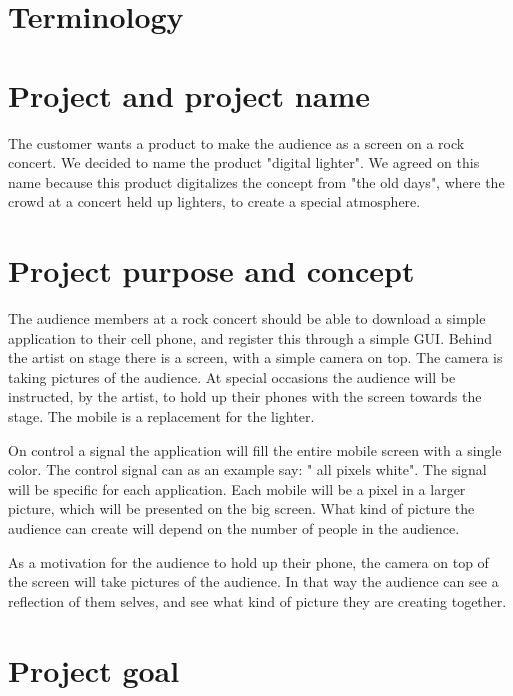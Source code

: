 \section {Terminology}
\section{Project and project name}

The customer wants a product to make the audience as a screen on a rock concert. We decided to name the product "digital lighter". We agreed on this name because this product digitalizes the concept from "the old days", where the crowd at a concert held up lighters, to create a special atmosphere. 

\section{Project purpose and concept}

The audience members at a rock concert should be able to download a simple application to their cell phone, and register this through a simple GUI.
Behind the artist on stage there is a screen, with a simple camera on top. 
The camera is taking pictures of the audience. 
At special occasions the audience will be instructed, by the artist, to hold up their phones with the screen towards the stage. 
The mobile is a replacement for the lighter.  

On control a signal the application will fill the entire mobile screen with a single color.
The control signal can as an example say: " all pixels white". 
The signal will be specific for each application.
Each mobile will be a pixel in a larger picture, which will be presented on the big screen. 
What kind of picture the audience can create will depend on the number of people in the audience.   

As a motivation for the audience to hold up their phone, the camera on top of the screen will take pictures of the audience.
In that way the audience can see a reflection of them selves, and see what kind of picture they are creating together.

\section{Project goal}
